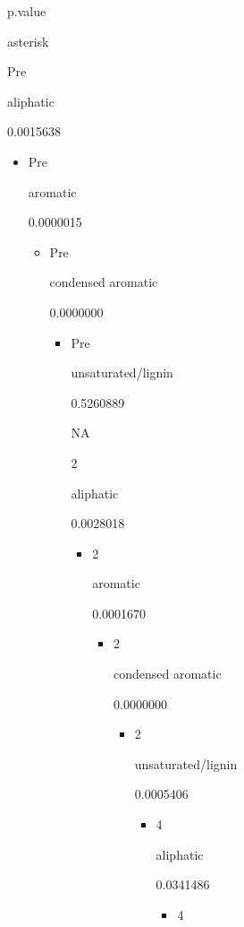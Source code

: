 \documentclass[
]{article}
\begin{document}
p.value

asterisk

Pre

aliphatic

0.0015638

\begin{itemize}
\item
  Pre

  aromatic

  0.0000015

  \begin{itemize}
  \item
    Pre

    condensed aromatic

    0.0000000

    \begin{itemize}
    \item
      Pre

      unsaturated/lignin

      0.5260889

      NA

      2

      aliphatic

      0.0028018

      \begin{itemize}
      \item
        2

        aromatic

        0.0001670

        \begin{itemize}
        \item
          2

          condensed aromatic

          0.0000000

          \begin{itemize}
          \item
            2

            unsaturated/lignin

            0.0005406

            \begin{itemize}
            \item
              4

              aliphatic

              0.0341486

              \begin{itemize}
              \item
                4


\end{itemize}
\end{itemize}
\end{itemize}
\end{itemize}
\end{itemize}
\end{itemize}
\end{itemize}
\end{itemize}
\end{document}
